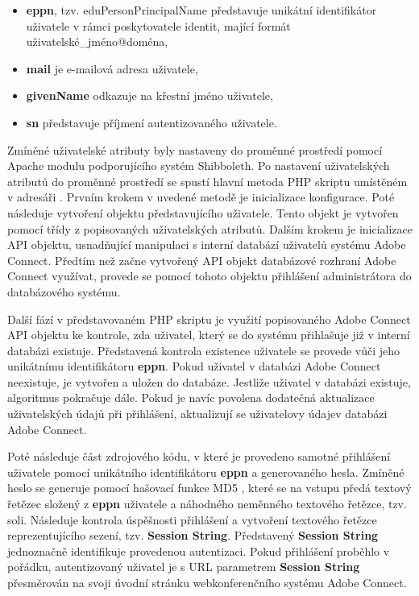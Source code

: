 \documentclass[
  printed, %
  twoside, %
  table,   %
  nolof,     %
  nolot,     %
]{fithesis3}
\begin{document}
\begin{itemize}
    \item \textbf{eppn}, tzv. eduPersonPrincipalName představuje unikátní identifikátor uživatele v rámci poskytovatele identit,  mající formát uživatelské\_jméno@doména,
    \item \textbf{mail} je e-mailová adresa uživatele, 
    \item \textbf{givenName} odkazuje na křestní jméno uživatele,
    \item \textbf{sn} představuje příjmení autentizovaného uživatele.
\end{itemize}
\label{item:adobe-connect}
Zmíněné uživatelské atributy byly nastaveny do proměnné prostředí pomocí Apache modulu podporujícího systém Shibboleth. Po nastavení uživatelských atributů do proměnné prostředí se spustí hlavní metoda  PHP skriptu  umístěném v adresáři . Prvním krokem v uvedené metodě je inicializace konfigurace. Poté následuje vytvoření objektu představujícího uživatele. Tento objekt je vytvořen pomocí třídy  z popisovaných uživatelských atributů. Dalším krokem je inicializace API objektu, usnadňující manipulaci s interní databází uživatelů systému Adobe Connect. Předtím než začne vytvořený API objekt databázové rozhraní Adobe Connect využívat, provede se pomocí tohoto objektu přihlášení administrátora do databázového systému. \par 

Další fází v představovaném PHP skriptu je využití popisovaného Adobe Connect API objektu ke kontrole, zda uživatel, který se do systému přihlašuje již v interní databázi existuje. Představená kontrola existence uživatele se provede vůči jeho unikátnímu identifikátoru \textbf{eppn}. Pokud uživatel v databázi Adobe Connect neexistuje, je vytvořen a uložen do databáze. Jestliže uživatel v databázi existuje, algoritmus pokračuje dále. Pokud je navíc povolena dodatečná aktualizace uživatelských údajů při přihlášení, aktualizují se uživatelovy údaje\break v databázi Adobe Connect. \par

Poté následuje část zdrojového kódu, v které je provedeno samotné přihlášení uživatele pomocí unikátního identifikátoru \textbf{eppn} a generovaného hesla. Zmíněné heslo se generuje pomocí hašovací funkce MD5 \cite{rfc1321}, které se na vstupu předá textový řetězec složený z \textbf{eppn} uživatele a náhodného neměnného textového řetězce, tzv. soli. Následuje kontrola úspěšnosti přihlášení a vytvoření textového řetězce reprezentujícího sezení, tzv. \textbf{Session String}. Představený \textbf{Session String} jednoznačně identifikuje provedenou autentizaci. Pokud přihlášení proběhlo v pořádku, autentizovaný uživatel je s URL parametrem \textbf{Session String} přesměrován na svoji úvodní stránku webkonferenčního systému Adobe Connect.      
\end{document}
